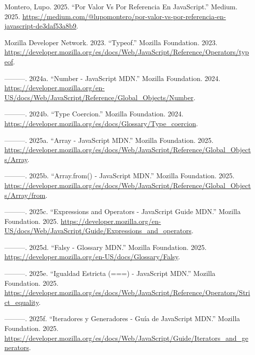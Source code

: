 \documentclass[
  letterpaper,
  DIV=11,
  numbers=noendperiod]{scrreprt}
\newlength{\cslhangindent}
\newenvironment{CSLReferences}[2] %
 {\begin{list}{}{%
  \setlength{\itemindent}{0pt}
  \setlength{\leftmargin}{0pt}
  \setlength{\parsep}{0pt}
  \ifodd #1
   \setlength{\leftmargin}{\cslhangindent}
   \setlength{\itemindent}{-1\cslhangindent}
  \fi
  \setlength{\itemsep}{#2\baselineskip}}}
 {\end{list}}
\begin{document}
\begin{CSLReferences}{1}{0}
Montero, Lupo. 2025. {``Por Valor Vs Por Referencia En JavaScript.''}
Medium. 2025.
\url{https://medium.com/@lupomontero/por-valor-vs-por-referencia-en-javascript-de3daf53a8b9}.

Mozilla Developer Network. 2023. {``Typeof.''} Mozilla Foundation. 2023.
\url{https://developer.mozilla.org/es/docs/Web/JavaScript/Reference/Operators/typeof}.

---------. 2024a. {``Number - JavaScript \textbar{} MDN.''} Mozilla
Foundation. 2024.
\url{https://developer.mozilla.org/en-US/docs/Web/JavaScript/Reference/Global_Objects/Number}.

---------. 2024b. {``Type Coercion.''} Mozilla Foundation. 2024.
\url{https://developer.mozilla.org/es/docs/Glossary/Type_coercion}.

---------. 2025a. {``Array - JavaScript \textbar{} MDN.''} Mozilla
Foundation. 2025.
\url{https://developer.mozilla.org/es/docs/Web/JavaScript/Reference/Global_Objects/Array}.

---------. 2025b. {``Array.from() - JavaScript \textbar{} MDN.''}
Mozilla Foundation. 2025.
\url{https://developer.mozilla.org/es/docs/Web/JavaScript/Reference/Global_Objects/Array/from}.

---------. 2025c. {``Expressions and Operators - JavaScript Guide
\textbar{} MDN.''} Mozilla Foundation. 2025.
\url{https://developer.mozilla.org/en-US/docs/Web/JavaScript/Guide/Expressions_and_operators}.

---------. 2025d. {``Falsy - Glossary \textbar{} MDN.''} Mozilla
Foundation. 2025.
\url{https://developer.mozilla.org/en-US/docs/Glossary/Falsy}.

---------. 2025e. {``Igualdad Estricta (===) - JavaScript \textbar{}
MDN.''} Mozilla Foundation. 2025.
\url{https://developer.mozilla.org/es/docs/Web/JavaScript/Reference/Operators/Strict_equality}.

---------. 2025f. {``Iteradores y Generadores - Guía de JavaScript
\textbar{} MDN.''} Mozilla Foundation. 2025.
\url{https://developer.mozilla.org/es/docs/Web/JavaScript/Guide/Iterators_and_generators}.


\end{CSLReferences}
\end{document}
